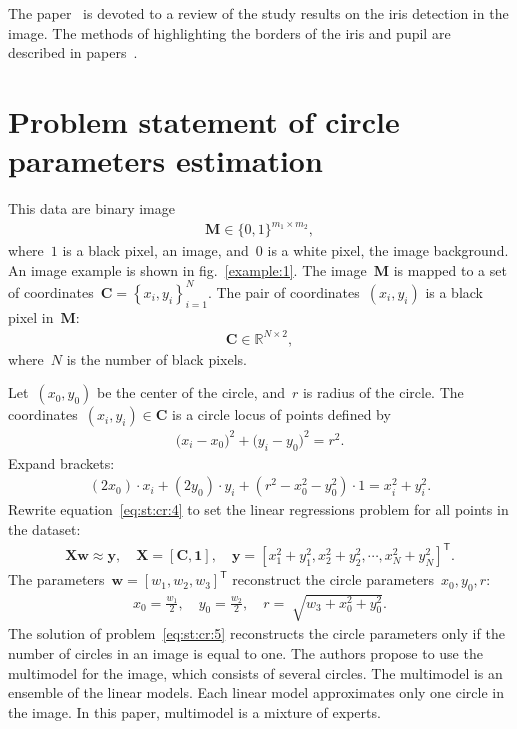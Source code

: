 \documentclass[12pt, twoside]{article}
\numberwithin{equation}{section}
\begin{document}
The paper~\cite{Bowyer2010} is devoted to a review of the study results on the iris detection in the image.
The methods of highlighting the borders of the iris and pupil are described in papers~\cite{Matveev2010, Matveev2014}.

\section{Problem statement of circle parameters estimation}
This data are binary image
\[
\label{eq:st:cr:1}
\begin{aligned}
\textbf{M} \in \{0,1\}^{m_1 \times m_2},
\end{aligned}
\]
where~$1$ is a black pixel, an image, and~$0$ is a white pixel, the image background. 
An image example is shown in fig.~\ref{example:1}.
The image~$\textbf{M}$ is mapped to a set of coordinates~$\textbf{C}=\left\{x_i, y_i\right\}_{i=1}^{N}$. The pair of coordinates~$(x_i, y_i)$ is a black pixel in~$\textbf{M}$:
\[
\label{eq:st:cr:2}
\begin{aligned}
\textbf{C} \in  \mathbb{R}^{N \times 2},
\end{aligned}
\]
where~$N$ is the number of black pixels.

Let~$(x_0, y_0)$ be the center of the circle, and~$r$ is radius of the circle.
 The coordinates~$\left(x_i, y_i\right)\in\textbf{C}$ is a circle locus of points defined by
\[
\label{eq:st:cr:3}
\begin{aligned}
\bigr(x_i - x_0\bigr)^{2}+\bigr(y_i-y_0\bigr)^2 = r^2.
\end{aligned}
\]
Expand brackets:
\[
\label{eq:st:cr:4}
\begin{aligned}
\left(2x_0\right)\cdot x_i + \left(2y_0\right)\cdot y_i+\left(r^2-x_0^2-y_0^2\right)\cdot1 = x_{i}^2 + y_{i}^2.
\end{aligned}
\]
Rewrite equation~\eqref{eq:st:cr:4} to set the linear regressions problem for all points in the dataset:
\[
\label{eq:st:cr:5}
\begin{aligned}
\textbf{X}\textbf{w} \approx \textbf{y},  \quad \textbf{X} = \left[\textbf{C}, \textbf{1}\right], \quad \textbf{y} = \left[x_1^2+y_1^2, x_2^2+y_2^2, \cdots, x_N^2+y_N^2\right]^{\mathsf{T}}.
\end{aligned}
\]
The parameters~$\textbf{w} = \left[w_1, w_2, w_3\right]^{\mathsf{T}}$ reconstruct the circle parameters~$x_0, y_0, r$:
\[
\label{eq:st:cr:6}
\begin{aligned}
x_0 = \frac{w_1}{2}, \quad y_0 = \frac{w_2}{2}, \quad r = \sqrt[]{w_3+x_{0}^{2}+y_{0}^{2}}.
\end{aligned}
\]
The solution of problem~\eqref{eq:st:cr:5} reconstructs the circle parameters only if the number of circles in an image is equal to one.
The authors propose to use the multimodel for the image, which consists of several circles.
The multimodel is an ensemble of the linear models.
Each linear model approximates only one circle in the image.
In this paper, multimodel is a mixture of experts.
\end{document}
